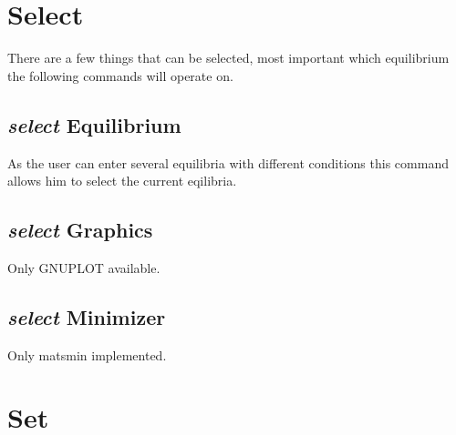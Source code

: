 \documentclass[12pt]{article}
\begin{document}
\section{Select }

There are a few things that can be selected, most important which
equilibrium the following commands will operate on.

\subsection{{\em select} Equilibrium}

As the user can enter several equilibria with different conditions
this command allows him to select the current eqilibria.

\subsection{{\em select} Graphics}

Only GNUPLOT available.

\subsection{{\em select} Minimizer}

Only matsmin implemented.

\section{Set }
\end{document}
